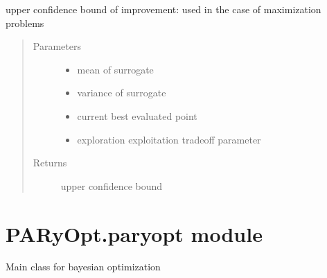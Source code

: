 \documentclass[letterpaper,12pt,english]{sphinxmanual}
\begin{document}
\begin{fulllineitems}
\label{\detokenize{PARyOpt:PARyOpt.acquisition_functions.upper_confidence_bound}}
\sphinxAtStartPar
upper confidence bound of improvement: used in the case of maximization problems
\begin{quote}\begin{description}
\item[{Parameters}] \leavevmode\begin{itemize}
\item {} 
\sphinxAtStartPar
{} \textendash{} mean of surrogate

\item {} 
\sphinxAtStartPar
{} \textendash{} variance of surrogate

\item {} 
\sphinxAtStartPar
{} \textendash{} current best evaluated point

\item {} 
\sphinxAtStartPar
{} \textendash{} exploration \sphinxhyphen{} exploitation tradeoff parameter

\end{itemize}

\item[{Returns}] \leavevmode
\sphinxAtStartPar
upper confidence bound

\end{description}\end{quote}

\end{fulllineitems}



\section{PARyOpt.paryopt module}
\label{\detokenize{PARyOpt:module-PARyOpt.paryopt}}\label{\detokenize{PARyOpt:paryopt-paryopt-module}}
\sphinxAtStartPar
Main class for bayesian optimization
\end{document}

